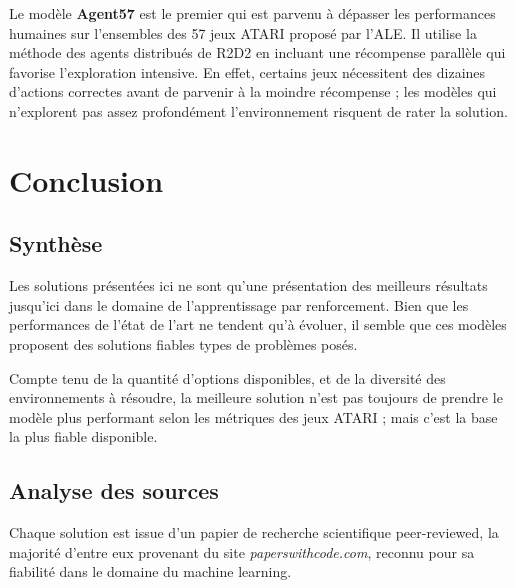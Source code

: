 \documentclass[a4paper,12pt]{article}
\begin{document}
Le modèle \textbf{Agent57} \cite{agent57} est le premier qui est parvenu à dépasser les performances humaines sur l'ensembles des 57 jeux ATARI proposé par l'ALE. Il utilise la méthode des agents distribués de R2D2 en incluant une récompense parallèle qui favorise l'exploration intensive. En effet, certains jeux nécessitent des dizaines d'actions correctes avant de parvenir à la moindre récompense ; les modèles qui n'explorent pas assez profondément l'environnement risquent de rater la solution.\par

\medskip
\section{Conclusion}

\medskip
\subsection{Synthèse}

Les solutions présentées ici ne sont qu'une présentation des meilleurs résultats jusqu'ici dans le domaine de l'apprentissage par renforcement. Bien que les performances de l'état de l'art ne tendent qu'à évoluer, il semble que ces modèles proposent des solutions fiables types de problèmes posés.\par
\medskip
Compte tenu de la quantité d'options disponibles, et de la diversité des environnements à résoudre, la meilleure solution n'est pas toujours de prendre le modèle plus performant selon les métriques des jeux ATARI ; mais c'est la base la plus fiable disponible.

\medskip
\subsection{Analyse des sources}

Chaque solution est issue d'un papier de recherche scientifique peer-reviewed, la majorité d'entre eux provenant du site \textit{paperswithcode.com}, reconnu pour sa fiabilité dans le domaine du machine learning.

\medskip


\end{document}
